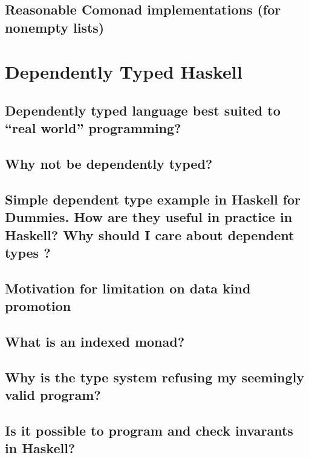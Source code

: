 \documentclass{book}
\begin{document}
\section{Reasonable Comonad implementations (for nonempty lists)}



\chapter{Dependently Typed Haskell}

\section{Dependently typed language best suited to “real world” programming?}


\section{Why not be dependently typed?}


\section{Simple dependent type example in Haskell for Dummies. How are they useful in practice in Haskell? Why should I care about dependent types ?}


\section{Motivation for limitation on data kind promotion}


\section{What is an indexed monad?}


\section{Why is the type system refusing my seemingly valid program?}


\section{Is it possible to program and check invarants in Haskell?}

\end{document}
